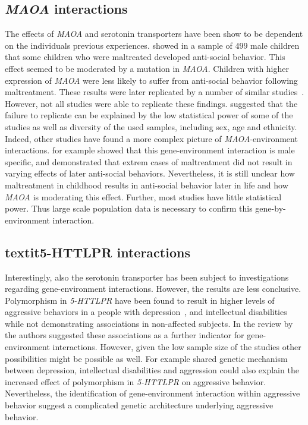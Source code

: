 \subsection{\textit{MAOA} interactions}
\label{sub:maoa_interactions}

The effects of \textit{MAOA} and serotonin transporters have been show to be dependent on the individuals previous experiences.
\citet{Caspi2002} showed in a sample of $499$ male children that some children who were maltreated developed anti-social behavior.
This effect seemed to be moderated by a mutation in \textit{MAOA}.
Children with higher expression of \textit{MAOA} were less likely to suffer from anti-social behavior following maltreatment.
These results were later replicated by a number of similar studies~\cite{KimCohen2006}.
However, not all studies were able to replicate these findings.
\citet{Anholt2012} suggested that the failure to replicate can be explained by the low statistical power of some of the studies as well as diversity of the used samples, including sex, age and ethnicity.
Indeed, other studies have found a more complex picture of \textit{MAOA}-environment interactions.
\citet{Huang2004} for example showed that this gene-environment interaction is male specific, and \citet{Weder2009} demonstrated that extrem cases of maltreatment did not result in varying effects of later anti-social behaviors.
Nevertheless, it is still unclear how maltreatment in childhood results in anti-social behavior later in life and how \textit{MAOA} is moderating this effect.
Further, most studies have little statistical power.
Thus large scale population data is necessary to confirm this gene-by-environment interaction.

\subsection{textit{5-HTTLPR} interactions}
\label{sub:maoa_interactions}
Interestingly, also the serotonin transporter has been subject to investigations regarding gene-environment interactions.
However, the results are less conclusive.
Polymorphism in \textit{5-HTTLPR} have been found to result in higher levels of aggressive behaviors in a people with depression~\cite{Gonda2011}, and intellectual disabilities~\cite{May2010} while not demonstrating associations in non-affected subjects.
In the review by~\citet{Anholt2012} the authors suggested these associations as a further indicator for gene-environment interactions.
However, given the low sample size of the studies other possibilities might be possible as well.
For example shared genetic mechanism between depression, intellectual disabilities and aggression could also explain the increased effect of polymorphism in \textit{5-HTTLPR} on aggressive behavior. 
Nevertheless, the identification of gene-environment interaction within aggressive behavior suggest a complicated genetic architecture underlying aggressive behavior.
\bigskip


